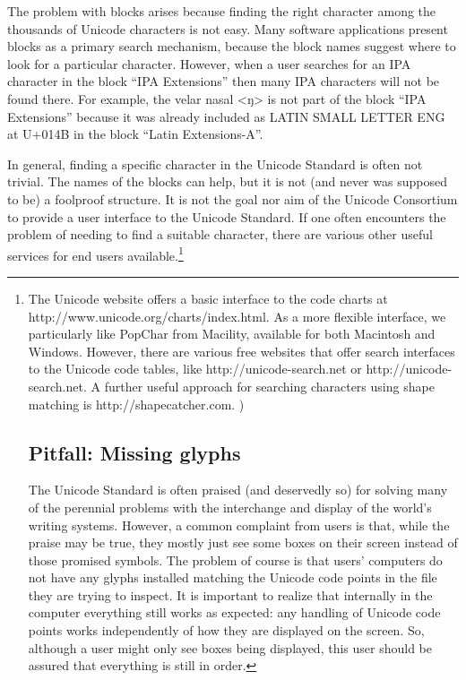 {{{{{{{{{{{{{{{{The problem with blocks arises because finding the right character among the thousands of Unicode characters is not easy. Many software applications present blocks as a primary search mechanism, because the block names suggest where to look for a particular character. However, when a user searches for an IPA character in the block ``IPA Extensions'' then many IPA characters will not be found there. For example, the velar nasal <ŋ> is not part of the block ``IPA Extensions'' because it was already included as LATIN SMALL LETTER ENG at U+014B in the block ``Latin Extensions-A''.

In general, finding a specific character in the Unicode Standard is often not trivial. The names of the blocks can help, but it is not (and never was supposed to be) a foolproof structure. It is not the goal nor aim of the Unicode Consortium to provide a user interface to the Unicode Standard. If one often encounters the problem of needing to find a suitable character, there are various other useful services for end users available.\footnote{The Unicode website offers a basic interface to the code charts at http://www.unicode.org/charts/index.html. As a more flexible interface, we particularly like PopChar from Macility, available for both Macintosh and Windows. However, there are various free websites that offer search interfaces to the Unicode code tables, like http://unicode-search.net or http://unicode-search.net. A further useful approach for searching characters using shape matching is http://shapecatcher.com. )

\subsection{Pitfall: Missing glyphs}\label{pitfall-missing-glyphs}

The Unicode Standard is often praised (and deservedly so) for solving many of the perennial problems with the interchange and display of the world's writing systems. However, a common complaint from users is that, while the praise may be true, they mostly just see some boxes on their screen instead of those promised symbols. The problem of course is that users' computers do not have any glyphs installed matching the Unicode code points in the file they are trying to inspect. It is important to realize that internally in the computer everything still works as expected: any handling of Unicode code points works independently of how they are displayed on the screen. So, although a user might only see boxes being displayed, this user should be assured that everything is still in order.

}}}}}}}}}}}}}}}}}
